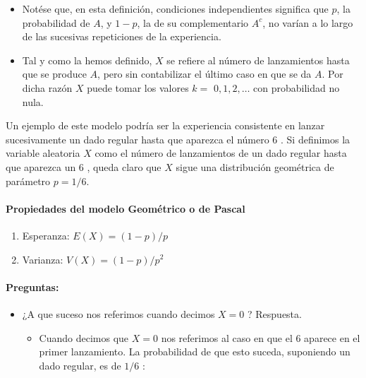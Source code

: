 \documentclass[
]{article}
\providecommand{\tightlist}{%
  \setlength{\itemsep}{0pt}\setlength{\parskip}{0pt}}
\begin{document}
\begin{itemize}
\tightlist
\item
  Notése que, en esta definición, condiciones independientes significa que \(p\), la probabilidad de \(A\), y \(1-p\), la de su complementario \(A^{c}\), no varían a lo largo de las sucesivas repeticiones de la experiencia.
\item
  Tal y como la hemos definido, \(X\) se refiere al número de lanzamientos hasta que se produce \(A\), pero sin contabilizar el último caso en que se da \(A\). Por dicha razón \(X\) puede tomar los valores \(k=\) \(0,1,2, \ldots\) con probabilidad no nula.
\end{itemize}

Un ejemplo de este modelo podría ser la experiencia consistente en lanzar sucesivamente un dado regular hasta que aparezca el número 6 . Si definimos la variable aleatoria \(X\) como el número de lanzamientos de un dado regular hasta que aparezca un 6 , queda claro que \(X\) sigue una distribución geométrica de parámetro \(p=1 / 6\).

\paragraph{Propiedades del modelo Geométrico o de Pascal}\label{propiedades-del-modelo-geomuxe9trico-o-de-pascal}

\begin{enumerate}
\def\labelenumi{\arabic{enumi})}
\tightlist
\item
  Esperanza: \(E(X)=(1-p) / p\)
\item
  Varianza: \(V(X)=(1-p) / p^{2}\)
\end{enumerate}

\paragraph{Preguntas:}\label{preguntas}

\begin{itemize}
\item
  ¿A que suceso nos referimos cuando decimos \(X=0\) ? Respuesta.

  \begin{itemize}
  \tightlist
  \item
    Cuando decimos que \(X=0\) nos referimos al caso en que el 6 aparece en el primer lanzamiento. La probabilidad de que esto suceda, suponiendo un dado regular, es de \(1 / 6\) :
  \end{itemize}
\end{itemize}
\end{document}
